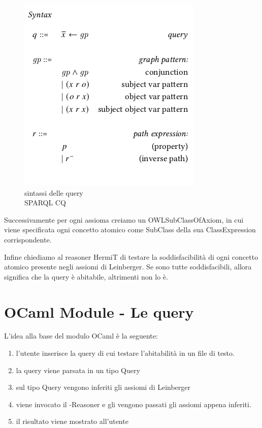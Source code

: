 \begin{figure}[H]
    \centering
    \includegraphics[scale=0.6]{pictures/leinbergSyntax}
    \caption{sintassi delle query \\ SPARQL CQ}
    \label{fig:leinbergerSyntax}
\end{figure}

Successivamente per ogni assioma creiamo un OWLSubClassOfAxiom, in cui viene specificata ogni concetto atomico come SubClass della sua ClassExpression corrispondente.

Infine chiediamo al reasoner HermiT di testare la soddisfacibilità di ogni concetto atomico presente negli assiomi di Leinberger. Se sono tutte soddisfacibili, allora significa che la query è abitabile, altrimenti non lo è.

\section{OCaml Module - Le query}
L'idea alla base del modulo OCaml è la seguente:
\begin{enumerate}
    \item l'utente inserisce la query di cui testare l'abitabilità in un file di testo.
    \item la query viene parsata in un tipo Query
    \item sul tipo Query vengono inferiti gli assiomi di Leinberger
    \item viene invocato il -Reasoner e gli vengono passati gli assiomi appena inferiti.
    \item il risultato viene mostrato all'utente
\end{enumerate}

